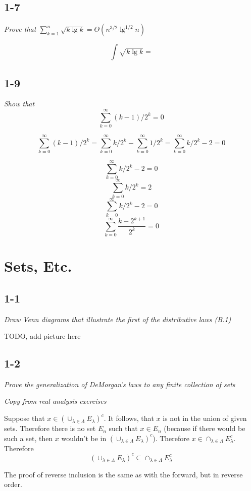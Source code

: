 \documentclass[11pt,oneside,titlepage]{book}
\begin{document}
\section*{1-7}
\textit{Prove that $\sum_{k = 1}^n{\sqrt{k \lg k}} = \Theta(n^{3/2}\lg^{1/2}n)$}

$$\int \sqrt{k \lg k} = $$

\section*{1-9}
\textit{Show that}
$$\sum_{k = 0}^{\infty}{(k - 1)/2^k} = 0$$

$$\sum_{k = 0}^{\infty}{(k - 1)/2^k} = \sum_{k = 0}^{\infty}{k/2^k} - \sum_{k = 0}^{\infty}{1/2^k} =
\sum_{k = 0}^{\infty}{k/2^k} - 2 = 0$$

$$\sum_{k = 0}^{\infty}{k/2^k} - 2 = 0$$
$$\sum_{k = 0}^{\infty}{k/2^k} = 2$$
$$\sum_{k = 0}^{\infty}{k/2^k - 2} = 0$$
$$\sum_{k = 0}^{\infty}{\frac{k - 2^{k + 1}}{2^k}} = 0$$


\chapter{Sets, Etc.}

\section*{1-1}
\textit{Draw Venn diagrams that illustrate the first of the distributive laws
(B.1)}

TODO, add picture here

\section*{1-2}
\textit{Prove the generalization of DeMorgan's laws to any finite collection
  of sets}

\textit{Copy from real analysis exercises}

Suppose that $x \in \left(\cup_{\lambda \in \Lambda} E_\lambda \right)^c$. It
follows, that $x$ is not in the union of given sets. Therefore there is no
set $E_n$ such that $x \in E_n$ (because if there would be such a set, then $x$
wouldn't be in $\left(\cup_{\lambda \in \Lambda} E_\lambda \right)^c$).
Therefore $x \in \cap_{\lambda \in \Lambda} E_\lambda^c$. Therefore 
$$\left(\cup_{\lambda \in \Lambda} E_\lambda \right)^c \subseteq
\cap_{\lambda \in \Lambda} E_\lambda^c$$

The proof of reverse inclusion is the same as with the forward, but in reverse
order.
\end{document}
